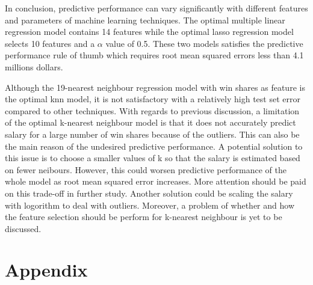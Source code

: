 \documentclass[letterpaper,12pt,twoside,]{pinp}
\begin{document}
In conclusion, predictive performance can vary significantly with
different features and parameters of machine learning techniques. The
optimal multiple linear regression model contains 14 features while the
optimal lasso regression model selects 10 features and a \(\alpha\)
value of 0.5. These two models satisfies the predictive performance rule
of thumb which requires root mean squared errors less than 4.1 millions
dollars.

Although the 19-nearest neighbour regression model with win shares as
feature is the optimal knn model, it is not satisfactory with a
relatively high test set error compared to other techniques. With
regards to previous discussion, a limitation of the optimal k-nearest
neighbour model is that it does not accurately predict salary for a
large number of win shares because of the outliers. This can also be the
main reason of the undesired predictive performance. A potential
solution to this issue is to choose a smaller values of k so that the
salary is estimated based on fewer neibours. However, this could worsen
predictive performance of the whole model as root mean squared error
increases. More attention should be paid on this trade-off in further
study. Another solution could be scaling the salary with logorithm to
deal with outliers. Moreover, a problem of whether and how the feature
selection should be perform for k-nearest neighbour is yet to be
discussed.

\vfill

\hypertarget{appendix}{%
\section{Appendix}\label{appendix}}
\end{document}
